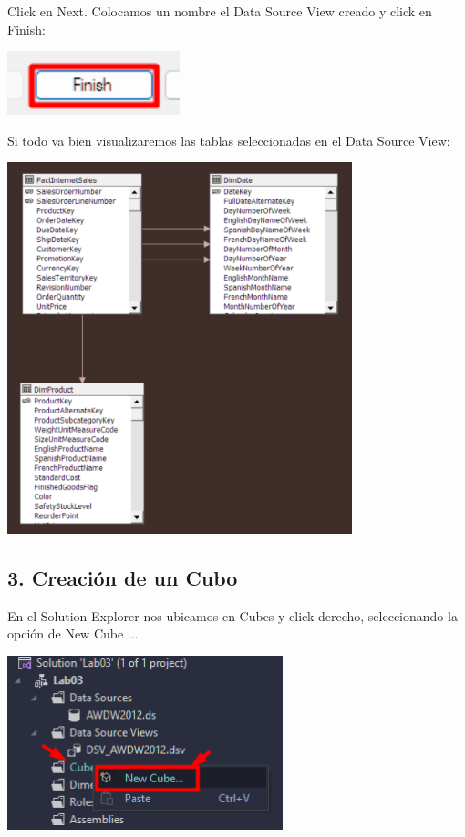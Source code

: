 \documentclass[12pt,letterpaper]{article}
\begin{document}
Click en Next. Colocamos un nombre el Data Source View creado y click en Finish:

\begin{center}
    \includegraphics[width=5cm]{./img/img10.png}
\end{center}

Si todo va bien visualizaremos las tablas seleccionadas en el Data Source View:

\begin{center}
    \includegraphics[width=10cm]{./img/img11.png}
\end{center}

\subsection{3. Creación de un Cubo}

En el Solution Explorer nos ubicamos en Cubes y click derecho, seleccionando la opción de New Cube ...

\begin{center}
    \includegraphics[width=8cm]{./img/img12.png}
\end{center}
\end{document}
